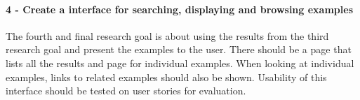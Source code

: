 
\paragraph{4 - Create a interface for searching, displaying and browsing examples}
The fourth and final research goal is about using the results from the third research goal and present the examples to the user. There should be a page that lists all the results and page for individual examples. When looking at individual examples, links to related examples should also be shown. Usability of this interface should be tested on user stories for evaluation.


\cleardoublepage